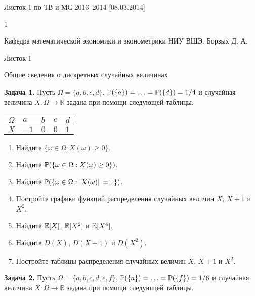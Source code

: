 

Листок 1 по ТВ и МС 2013--2014 [08.03.2014]





1

Кафедра математической экономики и эконометрики НИУ ВШЭ. Борзых Д. А.

Листок 1

Общие сведения о дискретных случайных величинах



\textbf{Задача 1.} Пусть $\Omega =\{ a,b,c,d\} $, ${\rm {\mathbb P}}(\{ a\} )=\ldots ={\rm {\mathbb P}}(\{ d\} )=1/4$ и случайная величина $X:\Omega \to {\mathbb R}$ задана при помощи следующей таблицы.

\begin{tabular}{|p{0.3in}|p{0.3in}|p{0.3in}|p{0.3in}|p{0.3in}|} \hline 
$\Omega $ & $a$ & $b$ & $c$ & $d$ \\ \hline 
$X$ & $-1$ & $0$ & $0$ & $1$ \\ \hline 
\end{tabular}



\begin{enumerate}
\item  Найдите $\{ \omega \in \Omega :X(\omega )\ge 0\} $.

\item  Найдите ${\rm {\mathbb P}}(\{ \omega \in \Omega :X(\omega )\ge 0\} )$.

\item  Найдите ${\rm {\mathbb P}}(\{ \omega \in \Omega :|X(\omega )|\, =1\} )$.

\item  Постройте графики функций распределения случайных величин $X$, $X+1$ и $X^{2} $.

\item  Найдите ${\rm {\mathbb E}}[X]$, ${\rm {\mathbb E}}[X^{2} ]$ и ${\rm {\mathbb E}}[X^{4} ]$.

\item  Найдите $D(X)$, $D(X+1)$ и $D(X^{2} )$.

\item  Постройте таблицы распределения случайных величин $X$, $X+1$ и $X^{2} $.
\end{enumerate}

\textbf{Задача 2.} Пусть $\Omega =\{ a,b,c,d,e,f\} $, ${\rm {\mathbb P}}(\{ a\} )=\ldots ={\rm {\mathbb P}}(\{ f\} )=1/6$ и случайная величина $X:\Omega \to {\mathbb R}$ задана при помощи следующей таблицы.

